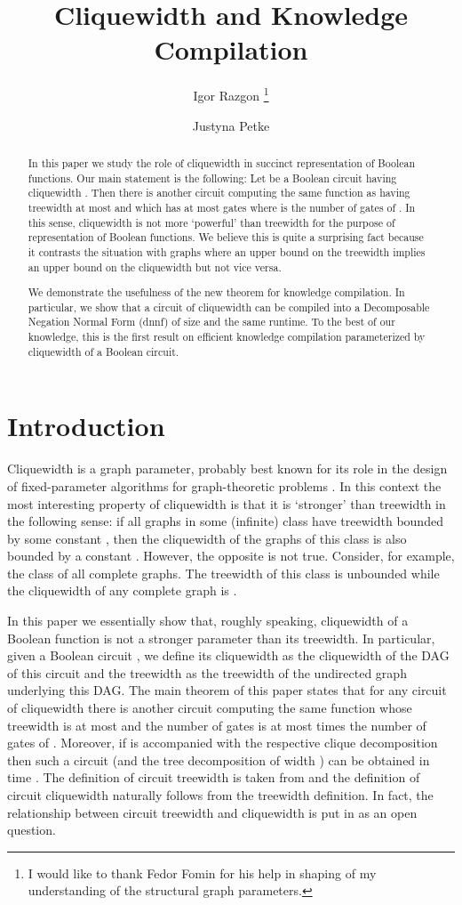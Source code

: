 \documentclass{llncs}
\title{Cliquewidth and Knowledge Compilation}
\author{Igor Razgon \thanks{I would like to thank Fedor Fomin for his help in shaping
of my understanding of the structural graph parameters.}\inst{1} \and Justyna Petke \inst{2}}
\institute{
Department of Computer Science and Information Systems, \\ 
Birkbeck, University of London \email{igor@dcs.bbk.ac.uk} \and
Department of Computer Science, \\ University College London
\email{J.Petke@cs.ucl.ac.uk} 
}
\begin{document}
\maketitle
\begin{abstract}
In this paper we study the role of cliquewidth in succinct representation of Boolean
functions. Our main statement is the following: Let  be a Boolean circuit having
cliquewidth . Then there is another circuit  computing the same function as 
having treewidth at most  and which has at most  gates where  is the number of gates of . 
In this sense, cliquewidth is not more `powerful' than
treewidth for the purpose of representation of Boolean functions. We believe this is quite 
a surprising fact because it contrasts the situation with graphs where an upper bound on the 
treewidth implies an upper bound on the cliquewidth but not vice versa.

We demonstrate the usefulness of the new theorem for knowledge compilation.
In particular, we show that a circuit  of cliquewidth  can be compiled into a Decomposable
Negation Normal Form ({\sc dnnf}) of size  and the same runtime. To the best of our knowledge, 
this is the first result on efficient knowledge compilation parameterized by cliquewidth of a 
Boolean circuit. 
\end{abstract}
\section{Introduction}
Cliquewidth is a graph parameter, probably best known for its role in the design of fixed-parameter algorithms
for graph-theoretic problems \cite{CoMaRo}. In this context the most interesting property of cliquewidth is that it
is `stronger' than treewidth in the following sense: if all graphs in some (infinite) class have treewidth bounded by some
constant , then the cliquewidth of the graphs of this class is also bounded by a constant . However, the
opposite is not true. Consider, for example, the class of all complete graphs. The treewidth of this class is unbounded
while the cliquewidth of any complete graph is . 


In this paper we essentially show that, roughly speaking, cliquewidth of a Boolean function is not
a stronger parameter than its treewidth. In particular, given a Boolean circuit , we define its cliquewidth
as the cliquewidth of the DAG of this circuit and the treewidth as the treewidth of the undirected graph 
underlying this DAG. The main theorem of this paper states that for any circuit  of cliquewidth  there is
another circuit  computing the same function whose treewidth is at most  and the number of gates is at most
 times the number of gates of . Moreover, if  is accompanied with the respective clique decomposition then
such a circuit  (and the tree decomposition of width ) can be obtained in time .
The definition of circuit treewidth is taken from \cite{OBDDTWJha} and the definition of circuit cliquewidth naturally
follows from the treewidth definition. In fact, the relationship between circuit treewidth and cliquewidth is 
put in \cite{OBDDTWJha} as an open question.
\end{document}
